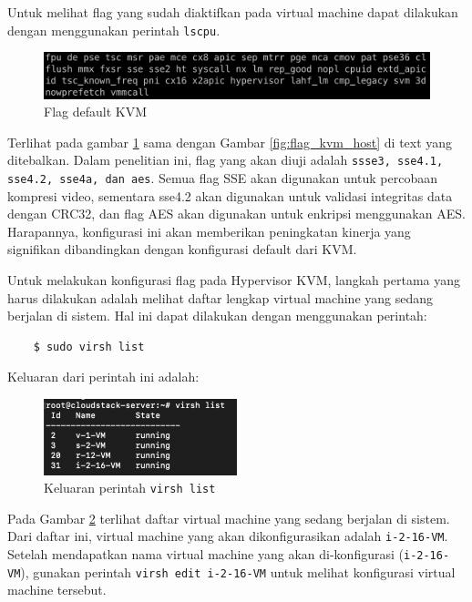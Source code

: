 Untuk melihat flag yang sudah diaktifkan pada virtual machine dapat dilakukan dengan menggunakan perintah \texttt{lscpu}.

\begin{figure}
    \centering
    \includegraphics[width=1\textwidth]
    {assets/pics/lscpu_original.jpeg}
    \caption{Flag default KVM}
    \label{fig:lscpu_original}
\end{figure}

Terlihat pada gambar \ref{fig:lscpu_original} sama dengan Gambar \ref{fig:flag_kvm_host} di text yang ditebalkan. Dalam penelitian ini, flag yang akan diuji adalah \texttt{ssse3, sse4.1, sse4.2, sse4a, dan aes}. Semua flag SSE akan digunakan untuk percobaan kompresi video, sementara sse4.2 akan digunakan untuk validasi integritas data dengan CRC32, dan flag AES akan digunakan untuk enkripsi menggunakan AES. Harapannya, konfigurasi ini akan memberikan peningkatan kinerja yang signifikan dibandingkan dengan konfigurasi default dari KVM.

Untuk melakukan konfigurasi flag pada Hypervisor KVM, langkah pertama yang harus dilakukan adalah melihat daftar lengkap virtual machine yang sedang berjalan di sistem. Hal ini dapat dilakukan dengan menggunakan perintah:

\begin{listing}[H]
    \begin{verbatim}
    $ sudo virsh list
    \end{verbatim}
\end{listing}

Keluaran dari perintah ini adalah:
\begin{figure}
    \centering
    \includegraphics[width=0.5\textwidth]
    {assets/pics/virsh_list.png}
    \caption{Keluaran perintah \texttt{virsh list}}
    \label{fig:virsh_list}
\end{figure}

Pada Gambar \ref{fig:virsh_list} terlihat daftar virtual machine yang sedang berjalan di sistem. Dari daftar ini, virtual machine yang akan dikonfigurasikan adalah \texttt{i-2-16-VM}. Setelah mendapatkan nama virtual machine yang akan di-konfigurasi (\texttt{i-2-16-VM}), gunakan perintah \texttt{virsh edit i-2-16-VM} untuk melihat konfigurasi virtual machine tersebut.

